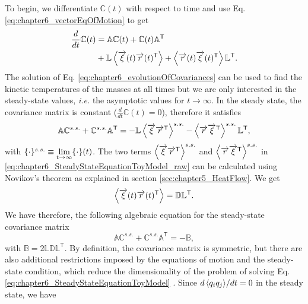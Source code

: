To begin, we differentiate $\mathbb{C}(t)$ with respect to time and use Eq. \eqref{eq:chapter6_vectorEqOfMotion} to get
%
\begin{align}
  \frac{d}{dt}\mathbb{C}(t) &=
  \mathbb{A}\mathbb{C}(t) +
  \mathbb{C}(t) \mathbb{A}^\mathsf{T}
  \nonumber\\
  &+
  \mathbb{L}\expval{ \overrightarrow{\xi}(t)\overrightarrow{r}(t)^\mathsf{T}}
+
  \expval{ \overrightarrow{r}(t)\overrightarrow{\xi}(t)^\mathsf{T}}\mathbb{L}^\mathsf{T}.
  \label{eq:chapter6_evolutionOfCovariances}
\end{align}
%
The solution of Eq. \eqref{eq:chapter6_evolutionOfCovariances} can be used to find the kinetic temperatures of the masses at all times but we are only interested in the steady-state values, \textit{i.e.} the asymptotic values for $t\to \infty$. In the steady state, the covariance matrix is constant ($\frac{d}{dt}\mathbb{C}(t)=0$), therefore it satisfies
%
\begin{equation}
  \mathbb{A}\mathbb{C}^{s.s.} +
  \mathbb{C}^{s.s.} \mathbb{A}^\mathsf{T}=
  - \mathbb{L}\expval{ \overrightarrow{\xi}\overrightarrow{r}^\mathsf{T}}^{s.s.}
  - \expval{ \overrightarrow{r}\overrightarrow{\xi}^\mathsf{T}}^{s.s.}\mathbb{L}^\mathsf{T},
  \label{eq:chapter6_SteadyStateEquationToyModel_raw}
\end{equation}
%
with $\small\{\cdot\small\}^{s.s.}\equiv \lim\limits_{t \to \infty} \small\{\cdot\small\}(t)$. The two terms $\expval{ \overrightarrow{\xi}\overrightarrow{r}^\mathsf{T}}^{s.s.}$ and  $\expval{\overrightarrow{r}\overrightarrow{\xi}^\mathsf{T}}^{s.s.}$ in \eqref{eq:chapter6_SteadyStateEquationToyModel_raw} can be calculated using Novikov's theorem \cite{Novikov1965} as explained in section \ref{sec:chapter5_HeatFlow}. We get
%
\begin{equation}
  \expval{ \overrightarrow{\xi}(t)\overrightarrow{r}(t)^\mathsf{T}} = \mathbb{D}\mathbb{L}^\mathsf{T}.
\end{equation}
%
We have therefore, the following algebraic equation for the steady-state covariance matrix
%
\begin{equation}
  \mathbb{A}\mathbb{C}^{s.s.} +
  \mathbb{C}^{s.s.}\mathbb{A}^\mathsf{T}
  =
  -\mathbb{B},
  \label{eq:chapter6_SteadyStateEquationToyModel}
\end{equation}
%
with $\mathbb{B} = 2 \mathbb{L}\mathbb{D}\mathbb{L}^\mathsf{T}$. By definition, the covariance matrix is  symmetric, but there are also  additional restrictions imposed by the equations of motion and the steady-state condition, which reduce the dimensionality of the problem of solving Eq. \eqref{eq:chapter6_SteadyStateEquationToyModel} \cite{Simon2019}. Since ${d \expval{ q_i q_j }}/{dt} = 0$ in the steady state, we have
